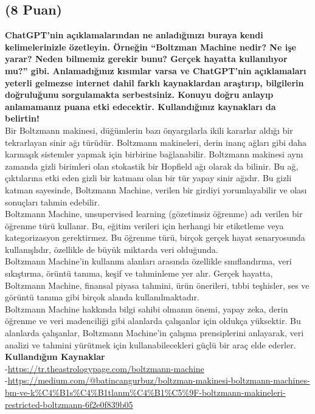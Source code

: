 \documentclass[11pt]{article}
\begin{document}
\subsection{(8 Puan)} \textbf{ChatGPT’nin açıklamalarından ne anladığınızı buraya kendi kelimelerinizle özetleyin. Örneğin ``Boltzman Machine nedir? Ne işe yarar? Neden bilmemiz gerekir bunu? Gerçek hayatta kullanılıyor mu?'' gibi. Anlamadığınız kısımlar varsa ve ChatGPT’nin açıklamaları yeterli gelmezse internet dahil farklı kaynaklardan araştırıp, bilgilerin doğruluğunu sorgulamakta serbestsiniz. Konuyu doğru anlayıp anlamamanız puana etki edecektir. Kullandığınız kaynakları da belirtin!}\\
Bir Boltzmann makinesi, düğümlerin bazı önyargılarla ikili kararlar aldığı bir tekrarlayan sinir ağı türüdür. Boltzmann makineleri, derin inanç ağları gibi daha karmaşık sistemler yapmak için birbirine bağlanabilir.
Boltzmann makinesi aynı zamanda gizli birimleri olan stokastik bir Hopfield ağı olarak da bilinir.
 Bu ağ, çıktılarına etki eden gizli bir katmanı olan bir tür yapay sinir ağıdır. Bu gizli katman sayesinde, Boltzmann Machine, verilen bir girdiyi yorumlayabilir ve olası sonuçları tahmin edebilir.\\

Boltzmann Machine, unsupervised learning (gözetimsiz öğrenme) adı verilen bir öğrenme türü kullanır. Bu, eğitim verileri için herhangi bir etiketleme veya kategorizasyon gerektirmez. Bu öğrenme türü, birçok gerçek hayat senaryosunda kullanışlıdır, özellikle de büyük miktarda veri olduğunda.\\

Boltzmann Machine'in kullanım alanları arasında özellikle sınıflandırma, veri sıkıştırma, örüntü tanıma, keşif ve tahminleme yer alır. Gerçek hayatta, Boltzmann Machine, finansal piyasa tahmini, ürün önerileri, tıbbi teşhisler, ses ve görüntü tanıma gibi birçok alanda kullanılmaktadır.\\

Boltzmann Machine hakkında bilgi sahibi olmanın önemi, yapay zeka, derin öğrenme ve veri madenciliği gibi alanlarda çalışanlar için oldukça yüksektir. Bu alanlarda çalışanlar, Boltzmann Machine'in çalışma prensiplerini anlayarak, veri analizi ve tahmini yürütmek için kullanabilecekleri güçlü bir araç elde ederler.\\
\textbf{Kullandığım Kaynaklar}\\
-\url{https://tr.theastrologypage.com/boltzmann-machine}\\
-\url{https://medium.com/@batincangurbuz/boltzman-makinesi-boltzmann-machines-bm-ve-k%C4%B1s%C4%B1tlanm%C4%B1%C5%9F-boltzmann-makineleri-restricted-boltzmann-6f2e0f839b05}
\end{document}

